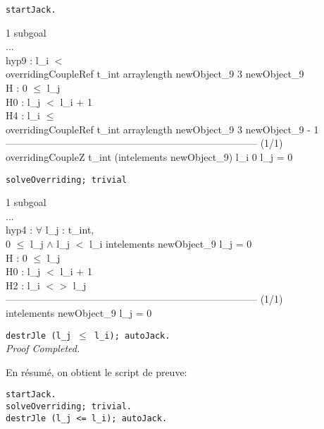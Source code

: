 \small
{\tt startJack.}\\
\begin{it}
1 subgoal\\
...\\
hyp9 : l\_i $<$\\
       overridingCoupleRef t\_int arraylength newObject\_9 3 newObject\_9\\
H : 0 $\leq$ l\_j\\
H0 : l\_j $<$ l\_i + 1\\
H4 : l\_i $\leq$\\
     overridingCoupleRef t\_int arraylength newObject\_9 3 newObject\_9 - 1\\
----------------------------------------------------------------------------- (1/1)\\
overridingCoupleZ t\_int (intelements newObject\_9) l\_i 0 l\_j = 0
\end{it}

\small
{\tt solveOverriding; trivial}\\
\begin{it}
1 subgoal\\
...\\
hyp4 : $\forall$ l\_j : t\_int,\\
0 $\leq$ l\_j $\wedge$ l\_j $<$ l\_i \rarrow intelements newObject\_9 l\_j = 0\\
H : 0 $\leq$ l\_j\\
H0 : l\_j $<$ l\_i + 1\\
H2 : l\_i $<>$ l\_j\\
----------------------------------------------------------------------------- (1/1)\\
intelements newObject\_9 l\_j = 0\\
\end{it}

{\tt destrJle (l\_j $\leq$ l\_i); autoJack.}\\
{\it Proof Completed.}

En r\'esum\'e, on obtient le script de preuve:
\begin{center}
\begin{minipage}{6cm}
\begin{verbatim}
startJack.
solveOverriding; trivial.
destrJle (l_j <= l_i); autoJack.
\end{verbatim}
\end{minipage}
\end{center}